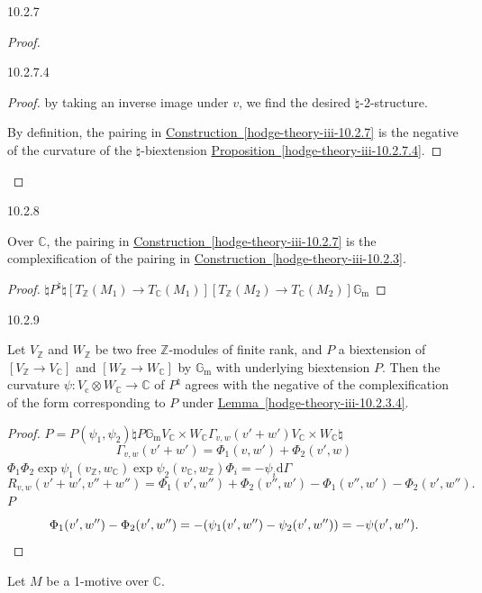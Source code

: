 \begin{construction}{10.2.7}
\begin{proof}
\begin{proposition}{10.2.7.4}
\begin{proof}
          by taking an inverse image under \(v\), we find the desired \(\natural \)-2-structure.\par{}By definition, the pairing in \hyperref[hodge-theory-iii-10.2.7]{Construction~\ref*{hodge-theory-iii-10.2.7}} is the negative of the curvature of the \(\natural \)-biextension \hyperref[hodge-theory-iii-10.2.7.4]{Proposition~\ref*{hodge-theory-iii-10.2.7.4}}.\end{proof}\end{proposition}\end{proof}\end{construction}\begin{proposition}{10.2.8}\label{hodge-theory-iii-10.2.8}\skipsinglepar\par{}Over \(\mathbb {C}\), the pairing in \hyperref[hodge-theory-iii-10.2.7]{Construction~\ref*{hodge-theory-iii-10.2.7}} is the complexification of the pairing in \hyperref[hodge-theory-iii-10.2.3]{Construction~\ref*{hodge-theory-iii-10.2.3}}.\begin{proof}\(\natural \)\(P^\natural \)\(\natural \)\([T_\mathbb {Z}(M_1)\to  T_\mathbb {C}(M_1)]\)\([T_\mathbb {Z}(M_2)\to  T_\mathbb {C}(M_2)]\)\(\mathbb {G}_\mathrm {m}\)\end{proof}\end{proposition}\begin{lemma}{10.2.9}\label{hodge-theory-iii-10.2.9}\skipsinglepar\par{}Let \(V_\mathbb {Z}\) and \(W_\mathbb {Z}\) be two free \(\mathbb {Z}\)-modules of finite rank, and \(P\) a biextension of \([V_\mathbb {Z}\to  V_\mathbb {C}]\) and \([W_\mathbb {Z}\to  W_\mathbb {C}]\) by \(\mathbb {G}_\mathrm {m}\) with underlying biextension \(P\).
    Then the curvature \(\psi \colon  V_\mathrm {c}\otimes  W_\mathbb {C}\to \mathbb {C}\) of \(P^\natural \) agrees with the negative of the complexification of the form corresponding to \(P\) under \hyperref[hodge-theory-iii-10.2.3.4]{Lemma~\ref*{hodge-theory-iii-10.2.3.4}}.\begin{proof}\(P=P(\psi _1,\psi _2)\)\(\natural \)\(P\)\(\mathbb {G}_\mathrm {m}\)\(V_\mathbb {C}\times  W_\mathbb {C}\)\(\Gamma _{v,w}(v'+w')\)\(V_\mathbb {C}\times  W_\mathbb {C}\)\(\natural \)\[       \Gamma _{v,w}(v'+w')       = \Phi _1(v,w') + \Phi _2(v',w)     \]\(\Phi _1\)\(\Phi _2\)\(\exp \psi _1(v_\mathbb {Z},w_\mathbb {C})\)\(\exp \psi _2(v_\mathbb {C},w_\mathbb {Z})\)\(\Phi _i=-\psi _i\)\(\mathrm {d}\Gamma \)\[       R_{v,w}(v'+w',v''+w'')       = \Phi _1(v',w'') + \Phi _2(v'',w') - \Phi _1(v'',w') - \Phi _2(v',w'').     \]\(P\)\[       \Phi _1(v',w'') - \Phi _2(v',w'')       = -(\psi _1(v',w'') - \psi _2(v',w''))       = -\psi (v',w'').     \qedhere\]\end{proof}\end{lemma}\label{hodge-theory-iii-10.2.10}\par{}Let \(M\) be a 1-motive over \(\mathbb {C}\).
